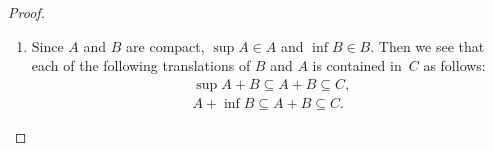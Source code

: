 \begin{proof}
\begin{enumerate}
\begin{enumerate}
            Finally, we obtain
            \begin{equation}
                \mu(A_\epsilon) + \mu(B_\epsilon) \leq \mu(C)
                \label{eqn: BM for cpt}
            \end{equation}
            for non-empty measurable compact sets \(A_\epsilon\) and \(B_\epsilon\) with finite measure.

            Therefore, we conclude that 
            \begin{equation*}
                \mu(A) + \mu(B) < \mu(A_\epsilon) + \mu(B_\epsilon) + \epsilon \leq \mu(C) + \epsilon
            \end{equation*}
            where the first inequality holds from (\ref{eqn: volA bdd by Ae}) and (\ref{eqn: volB bdd by Be}) and the second follows from (\ref{eqn: BM for cpt}).
            Since this argument holds for any fixed \(\epsilon>0\), the proof is complete.

        \end{enumerate}
        
        -- TO-DO : complete the blueprint of Step 3 (under cpt setting)
        
        \item Since \(A\) and \(B\) are compact, { \(\sup A \in A\) and \(\inf B \in B\). Then} we see that each of the following translations of \(B\) and \(A\) is contained in~\(C\) as follows:
        \begin{eqnarray*}
            \sup A + B
            {
             \subseteq A + B} \subseteq C, \\
            A + \inf B
            {
             \subseteq A + B} \subseteq C.
        \end{eqnarray*}
        

\end{enumerate}
\end{proof}
